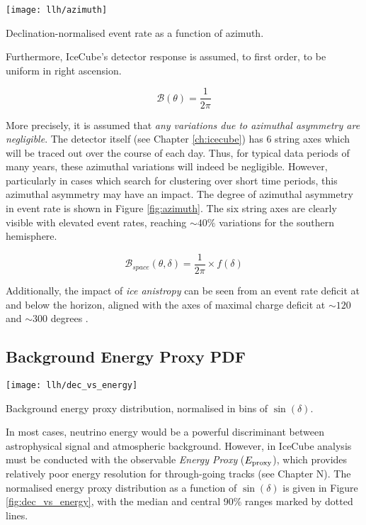 \begin{marginfigure}
	\centering \texttt{[image: llh/azimuth]}
	\caption{Declination-normalised event rate as a function of azimuth.}
	\label{fig:azimuth}
\end{marginfigure}

Furthermore, IceCube's detector response is assumed, to first order, to be uniform in right ascension.

\begin{equation}
\mathcal{B} (\theta) = \frac{1}{2\pi} 
\end{equation}

More precisely, it is assumed that \emph{any variations due to azimuthal asymmetry are negligible}. The detector itself (see Chapter \ref{ch:icecube}) has 6 string axes which will be traced out over the course of each day. Thus, for typical data periods of many years, these azimuthal variations will indeed be negligible. However, particularly in cases which search for clustering over short time periods, this azimuthal asymmetry may have an impact. The degree of azimuthal asymmetry in event rate is shown in Figure \ref{fig:azimuth}.  The six string axes are clearly visible with elevated event rates, reaching $\sim40\%$ variations for the southern hemisphere.

\begin{equation}
\mathcal{B}_{space} (\theta, \delta) = \frac{1}{2\pi} \times f(\delta)
\end{equation}


Additionally, the impact of \emph{ice anistropy} can be seen from an event rate deficit at and below the horizon, aligned with the axes of maximal charge deficit at $\sim 120$ and $\sim 300$ degrees .

\subsection{Background Energy Proxy PDF}


\begin{marginfigure}
	\centering \texttt{[image: llh/dec\_vs\_energy]}
	\caption{Background energy proxy distribution, normalised in bins of $\sin(\delta)$.}
	\label{fig:dec_vs_energy}
\end{marginfigure}

In most cases, neutrino energy would be a powerful discriminant between astrophysical signal and atmospheric background. However, in IceCube analysis must be conducted with the observable \emph{Energy Proxy}  ($E_{\textup{proxy}}$), which provides relatively poor energy resolution for through-going tracks (see Chapter N). The normalised energy proxy distribution as a function of $\sin(\delta)$ is given in Figure \ref{fig:dec_vs_energy}, with the median and central 90\% ranges marked by dotted lines. 

